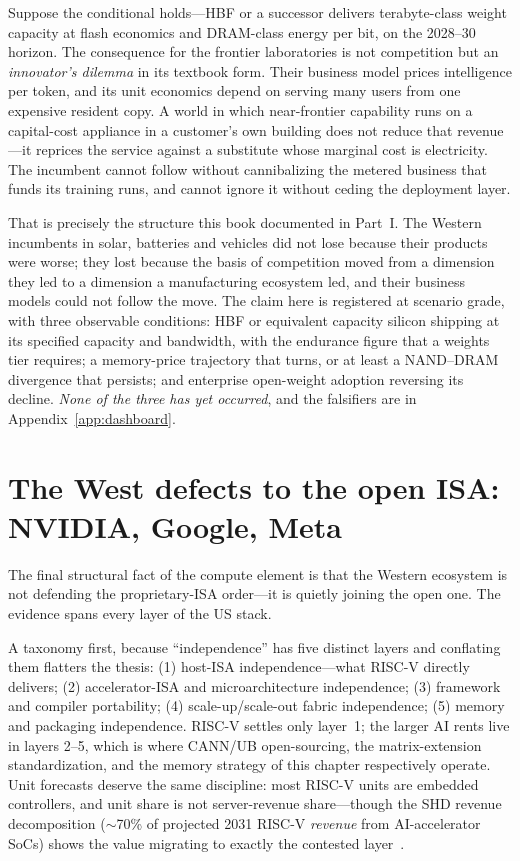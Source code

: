 Suppose the conditional holds---HBF or a successor delivers terabyte-class weight capacity at flash economics and DRAM-class energy per bit, on the 2028--30 horizon. The consequence for the frontier laboratories is not competition but an \emph{innovator's dilemma} in its textbook form. Their business model prices intelligence per token, and its unit economics depend on serving many users from one expensive resident copy. A world in which near-frontier capability runs on a capital-cost appliance in a customer's own building does not reduce that revenue---it reprices the service against a substitute whose marginal cost is electricity. The incumbent cannot follow without cannibalizing the metered business that funds its training runs, and cannot ignore it without ceding the deployment layer.

That is precisely the structure this book documented in Part~I. The Western incumbents in solar, batteries and vehicles did not lose because their products were worse; they lost because the basis of competition moved from a dimension they led to a dimension a manufacturing ecosystem led, and their business models could not follow the move. The claim here is registered at scenario grade, with three observable conditions: HBF or equivalent capacity silicon shipping at its specified capacity and bandwidth, with the endurance figure that a weights tier requires; a memory-price trajectory that turns, or at least a NAND--DRAM divergence that persists; and enterprise open-weight adoption reversing its decline. \emph{None of the three has yet occurred}, and the falsifiers are in Appendix~\ref{app:dashboard}.

\section{The West defects to the open ISA: NVIDIA, Google, Meta}
\label{sec:west-riscv}

The final structural fact of the compute element is that the Western ecosystem is not defending the proprietary-ISA order---it is quietly joining the open one. The evidence spans every layer of the US stack.

A taxonomy first, because ``independence'' has five distinct layers and conflating them flatters the thesis: (1) host-ISA independence---what RISC-V directly delivers; (2) accelerator-ISA and microarchitecture independence; (3) framework and compiler portability; (4) scale-up/scale-out fabric independence; (5) memory and packaging independence. RISC-V settles only layer~1; the larger AI rents live in layers 2--5, which is where CANN/UB open-sourcing, the matrix-extension standardization, and the memory strategy of this chapter respectively operate. Unit forecasts deserve the same discipline: most RISC-V units are embedded controllers, and unit share is not server-revenue share---though the SHD revenue decomposition ($\sim$70\% of projected 2031 RISC-V \emph{revenue} from AI-accelerator SoCs) shows the value migrating to exactly the contested layer~\cite{shd-2026}.

